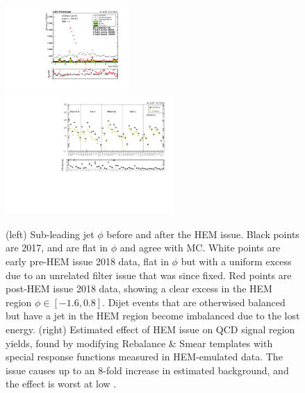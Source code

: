 \begin{figure}[t]
  \begin{center}
    \includegraphics[width=0.42\textwidth]{figs/event_selection/hem_subleadjetphi.pdf}
    \includegraphics[width=0.57\textwidth]{figs/event_selection/mc_closure_sr.pdf}
    \caption{(left) Sub-leading jet $\phi$ before and after the HEM issue.
      Black points are 2017, and are flat in $\phi$ and agree with MC. White
      points are early pre-HEM issue 2018 data, flat in $\phi$ but with 
      a uniform excess due to an unrelated filter issue that was since fixed.
      Red points are post-HEM issue 2018 data, showing a clear excess in the HEM region
      $\phi\in[-1.6,0.8]$. Dijet events that are otherwised balanced but have a jet in
      the HEM region become imbalanced due to the lost energy.
      (right) Estimated effect of HEM issue on QCD signal region yields, found by 
      modifying Rebalance \& Smear templates with special response functions measured
      in HEM-emulated data. The issue causes up to an 8-fold increase in estimated
      background, and the effect is worst at low \Ht.
            }
    \label{fig:hem}
  \end{center}
\end{figure}
